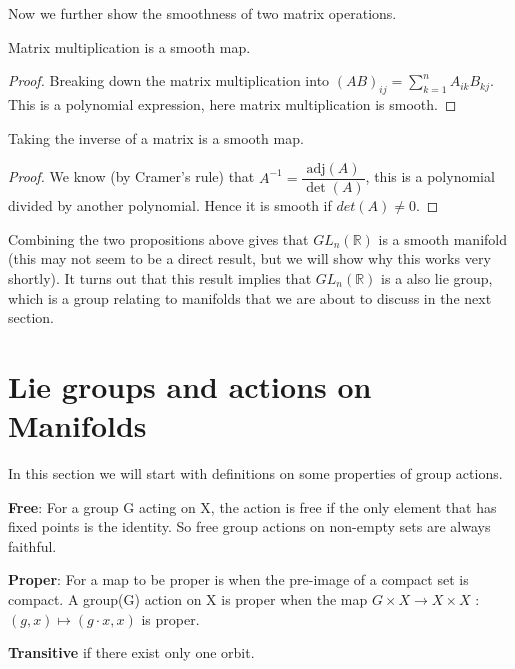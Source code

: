\documentclass[12pt,twoside]{article}
\begin{document}
Now we further show the smoothness of two matrix operations.
\begin{proposition}
Matrix multiplication is a smooth map.
\begin{proof}
Breaking down the matrix multiplication into $(AB)_{ij}=\sum_{k=1}^n A_{ik}B_{kj}$. This is a polynomial expression, here matrix multiplication is smooth.
\end{proof}
\end{proposition}
\begin{proposition}
Taking the inverse of a matrix is a smooth map.\\ 
\begin{proof}
We know (by Cramer's rule) that  $A^{-1}=\dfrac{\mbox{adj}(A)}{\det(A)}$, this is a polynomial divided by another polynomial. Hence it is smooth if $det(A)\neq 0$.
\end{proof}
\end{proposition}
Combining the two propositions above gives that $GL_{n}(\mathbb{R})$ is a smooth manifold (this may not seem to be a direct result, but we will show why this works very shortly). It turns out that this result implies that $GL_{n}(\mathbb{R})$ is a also lie group, which is a group relating to manifolds that we are about to discuss in the next section.\\

\section{Lie groups and actions on Manifolds}
In this section we will start with definitions on some properties of group actions. \cite{gp action wiki}
\begin{definition}
\textbf{Free}: For a group G acting on X, the action is free if the only element that has fixed points is the identity. So free group actions on non-empty sets are always faithful.
\end{definition}

\begin{definition}
\textbf{Proper}: For a map to be proper is when the pre-image of a compact set is compact. A group(G) action on X is proper when the map $G \times X\rightarrow X\times X$ : $(g,x) \mapsto (g\cdot x,x)$ is proper.
\end{definition}

\begin{definition}
\textbf{Transitive} if there exist only one orbit.
\end{definition}
\end{document}
